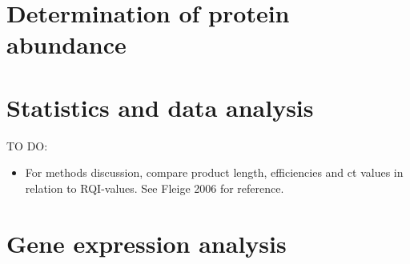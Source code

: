 \documentclass[twoside,10pt]{gihclass} %
\providecommand{\tightlist}{%
  \setlength{\itemsep}{0pt}\setlength{\parskip}{0pt}}
\begin{document}
\hypertarget{determination-of-protein-abundance}{%
\section{Determination of protein abundance}\label{determination-of-protein-abundance}}

\hypertarget{statistics-and-data-analysis}{%
\section{Statistics and data analysis}\label{statistics-and-data-analysis}}

TO DO:
\begin{itemize}
\tightlist
\item
  For methods discussion, compare product length, efficiencies and ct values in relation to RQI-values. See Fleige 2006 for reference.
\end{itemize}
\hypertarget{gene-expression-analysis-1}{%
\section{Gene expression analysis}\label{gene-expression-analysis-1}}
\end{document}
